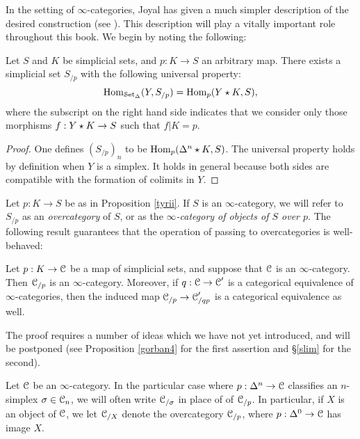 \begin{Didn't Read}
In the setting of $\infty$-categories, Joyal has given a much simpler description of the desired construction (see \cite{joyalpub}). This description will play a vitally important role throughout this book. We begin by noting the following:

\begin{proposition}\label{tyrii}
Let $S$ and $K$ be simplicial sets, and $p: K \rightarrow S$ an
arbitrary map. There exists a simplicial set $S_{/p}$ with the following universal property:
$$\operatorname{Hom}_{\operatorname{\mathcal{S}et_{\Delta}}}(Y, S_{/p}) = \operatorname{Hom}_{p}( Y \star K, S),$$
where the subscript on the right hand side indicates that we
consider only those morphisms $f: Y \star K \rightarrow S$ such
that $f|K = p$.
\end{proposition}

\begin{proof}
One defines $(S_{/p})_n$ to be $\operatorname{Hom}_{p}(\Delta^n \star K, S)$.
The universal property holds by definition when $Y$ is a simplex.
It holds in general because both sides are compatible with the
formation of colimits in $Y$.
\end{proof}

Let $p: K \rightarrow S$ be as in Proposition \ref{tyrii}. If $S$ is an $\infty$-category, we will refer to $S_{/p}$ as an {\it overcategory} of $S$, or as the {\it $\infty$-category of objects of $S$ over $p$}.
The following result guarantees that the operation of passing to overcategories is well-behaved:

\begin{proposition}\label{gorban3}
Let $p: K \rightarrow \operatorname{\mathcal{C}}$ be a map of simplicial sets, and suppose
that $\operatorname{\mathcal{C}}$ is an $\infty$-category. Then $\operatorname{\mathcal{C}}_{/p}$ is an $\infty$-category.
Moreover, if $q: \operatorname{\mathcal{C}} \rightarrow \operatorname{\mathcal{C}}'$ is a categorical equivalence of
$\infty$-categories, then the induced map $\operatorname{\mathcal{C}}_{/p} \rightarrow \operatorname{\mathcal{C}}'_{/qp}$ is a categorical equivalence
as well.
\end{proposition}

The proof requires a number of ideas which we have not yet introduced, and will be postponed (see Proposition \ref{gorban4} for the first assertion and \S \ref{slim} for the second).

\begin{remark}
Let $\operatorname{\mathcal{C}}$ be an $\infty$-category.
In the particular case where $p: \Delta^n \rightarrow \operatorname{\mathcal{C}}$ classifies an
$n$-simplex $\sigma \in \operatorname{\mathcal{C}}_n$, we will often write $\operatorname{\mathcal{C}}_{/\sigma}$ in place of of $\operatorname{\mathcal{C}}_{/p}$.
In particular, if $X$ is an object of $\operatorname{\mathcal{C}}$, we let $\operatorname{\mathcal{C}}_{/X}$ denote the overcategory
$\operatorname{\mathcal{C}}_{/p}$, where $p: \Delta^0 \rightarrow \operatorname{\mathcal{C}}$ has image $X$.
\end{remark}


\end{Didn't Read}
